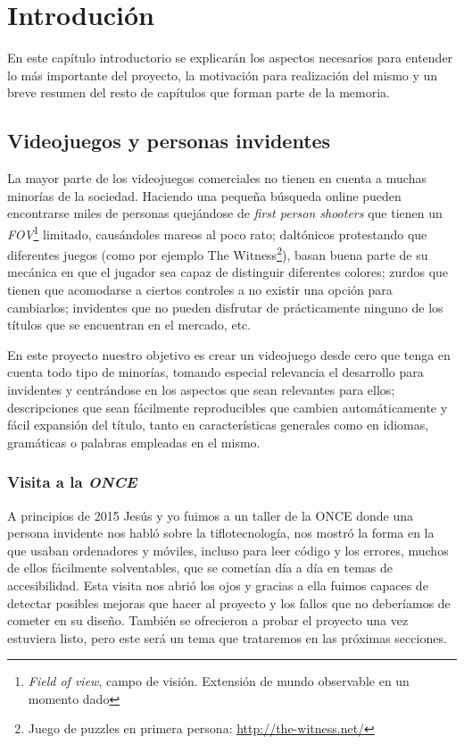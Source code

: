 \chapter[Introdución]{Introdución}

En este capítulo introductorio se explicarán los aspectos necesarios para entender lo más importante del proyecto, la motivación para realización del mismo y un breve resumen del resto de capítulos que forman parte de la memoria.

\section{Videojuegos y personas invidentes}
La mayor parte de los videojuegos comerciales no tienen en cuenta a muchas minorías de la sociedad. Haciendo una pequeña búsqueda online pueden encontrarse miles de personas quejándose de \textit{first person shooters} que tienen un \textit{FOV}\footnote{\textit{Field of view}, campo de visión. Extensión de mundo observable en un momento dado} limitado, causándoles mareos al poco rato; daltónicos protestando que diferentes juegos (como por ejemplo The Witness\footnote{Juego de puzzles en primera persona: \url{http://the-witness.net/}}), basan buena parte de su mecánica en que el jugador sea capaz de distinguir diferentes colores; zurdos que tienen que acomodarse a ciertos controles a no existir una opción para cambiarlos; invidentes que no pueden disfrutar de prácticamente ninguno de los títulos que se encuentran en el mercado, etc.

En este proyecto nuestro objetivo es crear un videojuego desde cero que tenga en cuenta todo tipo de minorías, tomando especial relevancia el desarrollo para invidentes y centrándose en los aspectos que sean relevantes para ellos; descripciones que sean fácilmente reproducibles que cambien automáticamente y fácil expansión del título, tanto en características generales como en idiomas, gramáticas o palabras empleadas en el mismo.

\subsection{Visita a la \textit{ONCE}}
A principios de 2015 Jesús y yo fuimos a un taller de la ONCE donde una persona invidente nos habló sobre la tiflotecnología, nos mostró la forma en la que usaban ordenadores y móviles, incluso para leer código y los errores, muchos de ellos fácilmente solventables, que se cometían día a día en temas de accesibilidad. Esta visita nos abrió los ojos y gracias a ella fuimos capaces de detectar posibles mejoras que hacer al proyecto y los fallos que no deberíamos de cometer en su diseño. También se ofrecieron a probar el proyecto una vez estuviera listo, pero este será un tema que trataremos en las próximas secciones.

